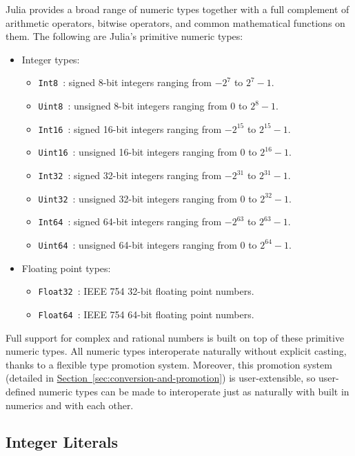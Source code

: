 \documentclass{article}
\renewcommand{\sec}[1]{\label{sec:#1}}
\newcommand{\Section}[1]{\hyperref[sec:#1]{Section~\ref*{sec:#1}}}
\begin{document}
Julia provides a broad range of numeric types together with a full complement of arithmetic operators, bitwise operators, and common mathematical functions on them.
The following are Julia's primitive numeric types:
\begin{itemize}
  \item Integer types:
  \begin{itemize}
    \item \verb|Int8|~: signed 8-bit integers ranging from $-2^7$ to $2^7-1$.
    \item \verb|Uint8|~: unsigned 8-bit integers ranging from 0 to $2^8-1$.
    \item \verb|Int16|~: signed 16-bit integers ranging from $-2^{15}$ to $2^{15}-1$.
    \item \verb|Uint16|~: unsigned 16-bit integers ranging from 0 to $2^{16}-1$.
    \item \verb|Int32|~: signed 32-bit integers ranging from $-2^{31}$ to $2^{31}-1$.
    \item \verb|Uint32|~: unsigned 32-bit integers ranging from 0 to $2^{32}-1$.
    \item \verb|Int64|~: signed 64-bit integers ranging from $-2^{63}$ to $2^{63}-1$.
    \item \verb|Uint64|~: unsigned 64-bit integers ranging from 0 to $2^{64}-1$.
  \end{itemize}
  \item Floating point types:
  \begin{itemize}
    \item \verb|Float32|~: IEEE 754 32-bit floating point numbers.
    \item \verb|Float64|~: IEEE 754 64-bit floating point numbers.
  \end{itemize}
\end{itemize}
Full support for complex and rational numbers is built on top of these primitive numeric types.
All numeric types interoperate naturally without explicit casting, thanks to a flexible type promotion system.
Moreover, this promotion system (detailed in \Section{conversion-and-promotion}) is user-extensible, so user-defined numeric types can be made to interoperate just as naturally with built in numerics and with each other.

\subsection{Integer Literals}\sec{integer-literals}
\end{document}
